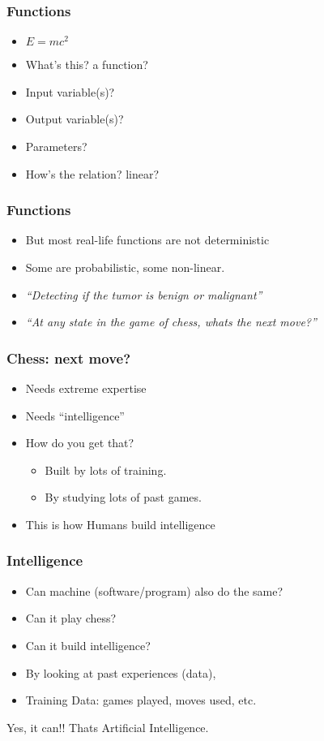 \begin{frame}[fragile]\frametitle{Functions}
\begin{itemize}
\item $E = mc^2$
\item What's this? a function?
\item Input variable(s)?
\item Output variable(s)?
\item Parameters?
\item How's the relation? linear?
\end{itemize}
\end{frame}



\begin{frame}[fragile]\frametitle{Functions}
\begin{itemize}
\item But most real-life functions are not deterministic
\item Some are probabilistic, some non-linear.
\item {\em ``Detecting if the tumor is benign or malignant''}
\item {\em ``At any state in the game of chess, whats the next move?''}
\end{itemize}
\end{frame}

\begin{frame}[fragile]\frametitle{Chess: next move?}
\begin{itemize}
\item Needs extreme expertise
\item Needs ``intelligence''
\item How do you get that?
\begin{itemize}
\item Built by lots of training.
\item By studying lots of past games.
\end{itemize}
\item This is how Humans build intelligence
\end{itemize}
\end{frame}

\begin{frame}[fragile]\frametitle{Intelligence}
\begin{itemize}
\item Can machine (software/program) also do the same?
\item Can it play chess?
\item Can it build intelligence?
\item By looking at past experiences (data), 
\item Training Data: games played, moves used, etc.
\end{itemize}
Yes, it can!! Thats Artificial Intelligence.
\end{frame}

